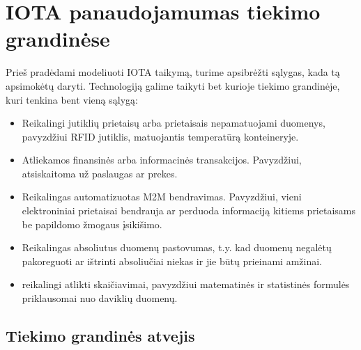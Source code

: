 
\section{IOTA panaudojamumas tiekimo grandinėse}

Prieš pradėdami modeliuoti IOTA taikymą, turime apsibrėžti sąlygas, kada tą apsimokėtų daryti. Technologiją galime taikyti bet kurioje tiekimo grandinėje, kuri tenkina bent vieną sąlygą:
\begin{itemize}
    \item Reikalingi jutiklių prietaisų arba prietaisais nepamatuojami duomenys, pavyzdžiui RFID jutiklis, matuojantis temperatūrą konteineryje.
    \item Atliekamos finansinės arba informacinės transakcijos. Pavyzdžiui, atsiskaitoma už paslaugas ar prekes.
    \item Reikalingas automatizuotas M2M bendravimas. Pavyzdžiui, vieni elektroniniai prietaisai bendrauja ar perduoda informaciją kitiems prietaisams be papildomo žmogaus įsikišimo.
    \item Reikalingas absoliutus duomenų pastovumas, t.y. kad duomenų negalėtų pakoreguoti ar ištrinti absoliučiai niekas ir jie būtų prieinami amžinai.
    \item reikalingi atlikti skaičiavimai, pavyzdžiui matematinės ir statistinės formulės priklausomai nuo daviklių duomenų.
\end{itemize}




\subsection{Tiekimo grandinės atvejis}

